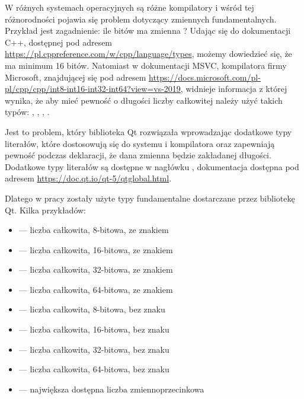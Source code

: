 \par
W różnych systemach operacyjnych są różne kompilatory i wśród tej różnorodności pojawia się problem dotyczący zmiennych fundamentalnych.
Przykład jest zagadnienie: ile bitów ma zmienna ?
Udając się do dokumentacji C++, dostępnej pod adresem \url{https://pl.cppreference.com/w/cpp/language/types}, możemy dowiedzieć się, że  ma minimum 16 bitów.
Natomiast w dokumentacji MSVC, kompilatora firmy Microsoft, znajdującej się pod adresem \url{https://docs.microsoft.com/pl-pl/cpp/cpp/int8-int16-int32-int64?view=vs-2019}, widnieje informacja z której wynika, że aby mieć pewność o długości liczby całkowitej należy użyć takich typów: , , , .
\par
Jest to problem, który biblioteka Qt rozwiązała wprowadzając dodatkowe typy literałów, które dostosowują się do systemu i kompilatora oraz zapewniają pewność podczas deklaracji, że dana zmienna będzie zakładanej długości.
Dodatkowe typy literałów są dostępne w nagłówku , dokumentacja dostępna pod adresem \url{https://doc.qt.io/qt-5/qtglobal.html}.

\par
Dlatego w pracy zostały użyte typy fundamentalne dostarczane przez bibliotekę Qt.
Kilka przykładów:
\begin{itemize}
    \item {} --- liczba całkowita, 8-bitowa, ze znakiem
    \item {} --- liczba całkowita, 16-bitowa, ze znakiem
    \item {} --- liczba całkowita, 32-bitowa, ze znakiem
    \item {} --- liczba całkowita, 64-bitowa, ze znakiem
    \item {} --- liczba całkowita, 8-bitowa, bez znaku
    \item {} --- liczba całkowita, 16-bitowa, bez znaku
    \item {} --- liczba całkowita, 32-bitowa, bez znaku
    \item {} --- liczba całkowita, 64-bitowa, bez znaku
    \item {} --- największa dostępna liczba zmiennoprzecinkowa
\end{itemize}